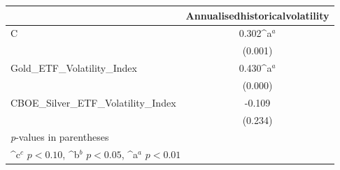 {
\def\sym#1{\ifmmode^{#1}\else\(^{#1}\)\fi}
\begin{tabular}{l*{1}{c}}
\toprule
          &\multicolumn{1}{c}{Annualisedhistoricalvolatility}\\
\midrule
C         &    0.302\sym{a}\\
          &  (0.001)       \\
\addlinespace
Gold\_ETF\_Volatility\_Index&    0.430\sym{a}\\
          &  (0.000)       \\
\addlinespace
CBOE\_Silver\_ETF\_Volatility\_Index&   -0.109       \\
          &  (0.234)       \\
\bottomrule
\multicolumn{2}{l}{\footnotesize \textit{p}-values in parentheses}\\
\multicolumn{2}{l}{\footnotesize \sym{c} \(p<0.10\), \sym{b} \(p<0.05\), \sym{a} \(p<0.01\)}\\
\end{tabular}
}
